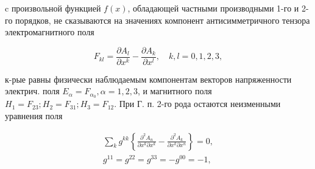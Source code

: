 \documentclass[10pt]{article}
\begin{document}
c произвольной функцией $f(x)$, обладающей частными производными 1-го и 2-го порядков, не сказываются на значениях компонент антисимметричного тензора электромагнитного поля



\[

F_{k l}=\frac{\partial A_{l}}{\partial x^{k}}-\frac{\partial A_{k}}{\partial x^{l}}, \quad k, l=0,1,2,3,

\]



к-рые равны физически наблюдаемым компонентам векторов напряженности электрич. поля $E_{\alpha}=F_{\alpha_{0}}, \alpha=1,2,3$, и магнитного поля $H_{1}=F_{23} ; H_{2}=F_{31} ; H_{3}=F_{12}$. При Г. п. 2-го рода остаются неизменными уравнения поля



\[

\begin{gathered}

\sum_{k} g^{k k}\left\{\frac{\partial^{2} A_{n}}{\partial x^{k} \partial x^{k}}-\frac{\partial^{2} A_{k}}{\partial x^{k} \partial x^{n}}\right\}=0, \\

g^{11}=g^{22}=g^{33}=-g^{00}=-1,

\end{gathered}

\]
\end{document}
